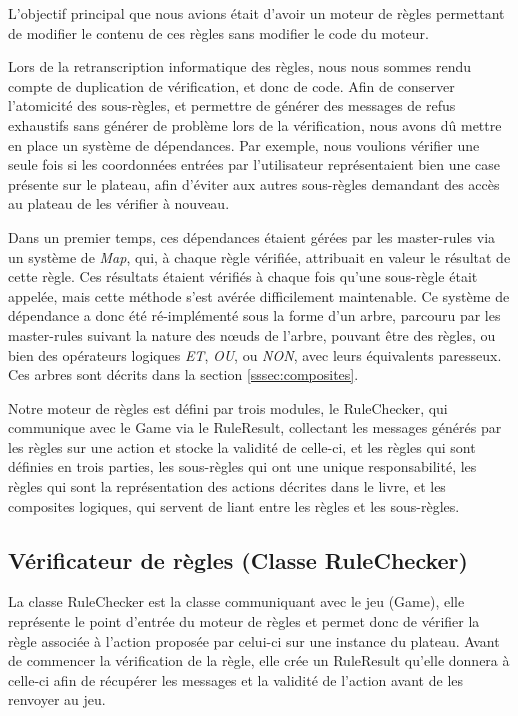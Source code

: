 \documentclass[a4paper]{report}
\begin{document}
L'objectif principal que nous avions était d'avoir un moteur de règles permettant de modifier le contenu de ces règles sans modifier le code du moteur.

Lors de la retranscription informatique des règles, nous nous sommes rendu compte de duplication de vérification, et donc de code. Afin de conserver l'atomicité des sous-règles, et permettre de générer des messages de refus exhaustifs sans générer de problème lors de la vérification, nous avons dû mettre en place un système de dépendances. 
Par exemple, nous voulions vérifier une seule fois si les coordonnées entrées par l'utilisateur représentaient bien une case présente sur le plateau, afin d'éviter aux autres sous-règles demandant des accès au plateau de les vérifier à nouveau.

Dans un premier temps, ces dépendances étaient gérées par les master-rules via un système de {\it Map}, qui, à chaque règle vérifiée, attribuait en valeur le résultat de cette règle. Ces résultats étaient vérifiés à chaque fois qu'une sous-règle était appelée, mais cette méthode s'est avérée difficilement maintenable.
Ce système de dépendance a donc été ré-implémenté sous la forme d'un arbre, parcouru par les master-rules suivant la nature des nœuds de l'arbre, pouvant être des règles, ou bien des opérateurs logiques {\it ET}, {\it OU}, ou {\it NON}, avec leurs équivalents paresseux. Ces arbres sont décrits dans la section \ref{sssec:composites}. %

Notre moteur de règles est défini par trois modules, le RuleChecker, qui communique avec le Game via le RuleResult, collectant les messages générés par les règles sur une action et stocke la validité de celle-ci, et les règles qui sont définies en trois parties, les sous-règles qui ont une unique responsabilité, les règles qui sont la représentation des actions décrites dans le livre, et les composites logiques, qui servent de liant entre les règles et les sous-règles.

\subsection{Vérificateur de règles (Classe RuleChecker)}

La classe RuleChecker est la classe communiquant avec le jeu (Game), elle représente le point d'entrée du moteur de règles et permet donc de vérifier la règle associée à l'action proposée par celui-ci sur une instance du plateau. Avant de commencer la vérification de la règle, elle crée un RuleResult qu'elle donnera à celle-ci afin de récupérer les messages et la validité de l'action avant de les renvoyer au jeu.
\end{document}
